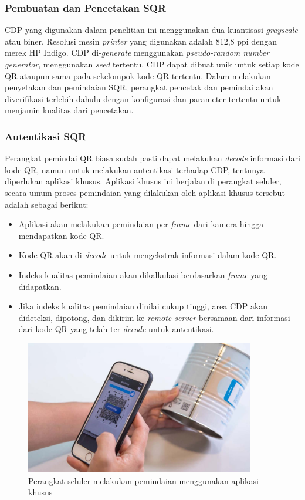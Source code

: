 \subsubsection{Pembuatan dan Pencetakan SQR}
CDP yang digunakan dalam penelitian ini menggunakan dua kuantisasi \emph{grayscale} atau biner. Resolusi mesin \emph{printer} yang digunakan adalah 812,8 ppi
dengan merek HP Indigo. CDP di-\emph{generate} menggunakan \emph{pseudo-random number generator}, menggunakan \emph{seed} tertentu. CDP dapat dibuat unik untuk
setiap kode QR ataupun sama pada sekelompok kode QR tertentu. Dalam melakukan penyetakan dan pemindaian SQR, perangkat pencetak dan pemindai akan diverifikasi
terlebih dahulu dengan konfigurasi dan parameter tertentu untuk menjamin kualitas dari pencetakan.

\subsubsection{Autentikasi SQR}
Perangkat pemindai QR biasa sudah pasti dapat melakukan \emph{decode} informasi dari kode QR, namun untuk melakukan autentikasi terhadap CDP, tentunya
diperlukan aplikasi khusus. Aplikasi khusus ini berjalan di perangkat seluler, secara umum proses pemindaian yang dilakukan oleh aplikasi khusus tersebut
adalah sebagai berikut:

\begin{itemize}
	\item Aplikasi akan melakukan pemindaian per-\emph{frame} dari kamera hingga mendapatkan kode QR.
	\item Kode QR akan di-\emph{decode} untuk mengekstrak informasi dalam kode QR.
	\item Indeks kualitas pemindaian akan dikalkulasi berdasarkan \emph{frame} yang didapatkan.
	\item Jika indeks kualitas pemindaian dinilai cukup tinggi, area CDP akan dideteksi, dipotong, dan dikirim ke \emph{remote server} bersamaan dari informasi dari kode
	      QR yang telah ter-\emph{decode} untuk autentikasi.
\end{itemize}

\begin{figure}[h]
	\centering
	\includegraphics[width=10cm]{contents/chapter-2/2-pemindaiansqr.jpg}
	\caption{Perangkat seluler melakukan pemindaian menggunakan aplikasi khusus \cite{picard2021counterfeit}}
	\label{Fig: 2-pemindaisqr}
\end{figure}

